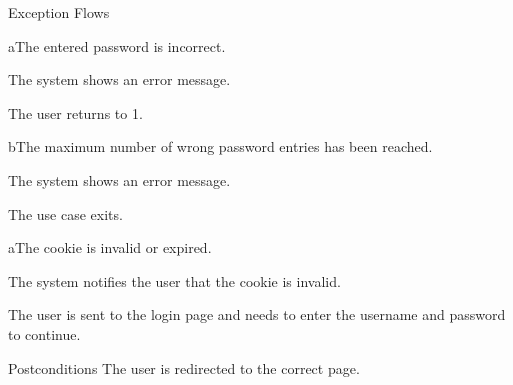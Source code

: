 \begin{cpartList}{Exception Flows}
  \begin{innerList}{2}{a}{The entered password is incorrect.}
    \item The system shows an error message.
    \item The user returns to 1.
  \end{innerList}
  \begin{innerList}{2}{b}{The maximum number of wrong password entries has been reached.}
    \item The system shows an error message.
    \item The use case exits.
  \end{innerList}
  \begin{innerList}{3}{a}{The cookie is invalid or expired.}
    \item The system notifies the user that the cookie is invalid.
    \item The user is sent to the login page and needs to enter the username and password to continue.
  \end{innerList}
\end{cpartList}

\begin{cpart}{Postconditions}
The user is redirected to the correct page.
\end{cpart}
